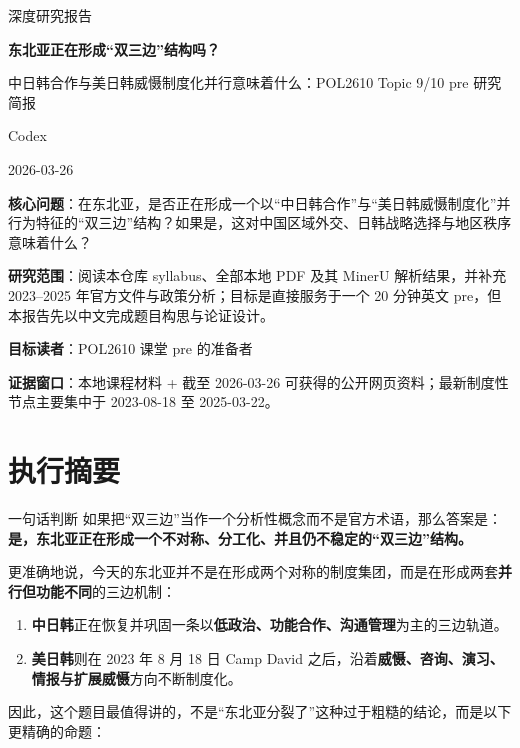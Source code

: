 \documentclass[a4paper]{article}
\newcommand{\reporttitle}{东北亚正在形成“双三边”结构吗？}
\newcommand{\reportsubtitle}{中日韩合作与美日韩威慑制度化并行意味着什么：POL2610 Topic 9/10 pre 研究简报}
\newcommand{\reportauthors}{Codex}
\newcommand{\reportdate}{2026-03-26}
\newcommand{\researchquestion}{在东北亚，是否正在形成一个以“中日韩合作”与“美日韩威慑制度化”并行为特征的“双三边”结构？如果是，这对中国区域外交、日韩战略选择与地区秩序意味着什么？}
\newcommand{\reportscope}{阅读本仓库 syllabus、全部本地 PDF 及其 MinerU 解析结果，并补充 2023--2025 年官方文件与政策分析；目标是直接服务于一个 20 分钟英文 pre，但本报告先以中文完成题目构思与论证设计。}
\newcommand{\reportaudience}{POL2610 课堂 pre 的准备者}
\newcommand{\sourcewindow}{本地课程材料 + 截至 2026-03-26 可获得的公开网页资料；最新制度性节点主要集中于 2023-08-18 至 2025-03-22。}
\begin{document}
\begin{titlepage}
\centering
{\Large 深度研究报告\par}
\vspace{1.0cm}
{\huge\bfseries \reporttitle\par}
\vspace{0.5cm}
{\Large \reportsubtitle\par}
\vspace{0.9cm}
{\large \reportauthors\par}
\vspace{0.2cm}
{\large \reportdate\par}
\vspace{1.0cm}

\begin{tcolorbox}[width=0.94\textwidth, colback=black!2!white, colframe=black!60, sharp corners]
\textbf{核心问题}：\researchquestion\par
\textbf{研究范围}：\reportscope\par
\textbf{目标读者}：\reportaudience\par
\textbf{证据窗口}：\sourcewindow\par
\end{tcolorbox}
\end{titlepage}

\tableofcontents
\newpage

\section{执行摘要}

\begin{findingbox}{一句话判断}
如果把“双三边”当作一个分析性概念而不是官方术语，那么答案是：\textbf{是，东北亚正在形成一个不对称、分工化、并且仍不稳定的“双三边”结构。}
\end{findingbox}

更准确地说，今天的东北亚并不是在形成两个对称的制度集团，而是在形成两套\textbf{并行但功能不同}的三边机制：

\begin{enumerate}
\item \textbf{中日韩}正在恢复并巩固一条以\textbf{低政治、功能合作、沟通管理}为主的三边轨道。
\item \textbf{美日韩}则在 2023 年 8 月 18 日 Camp David 之后，沿着\textbf{威慑、咨询、演习、情报与扩展威慑}方向不断制度化。
\end{enumerate}

因此，这个题目最值得讲的，不是“东北亚分裂了”这种过于粗糙的结论，而是以下更精确的命题：
\end{document}
